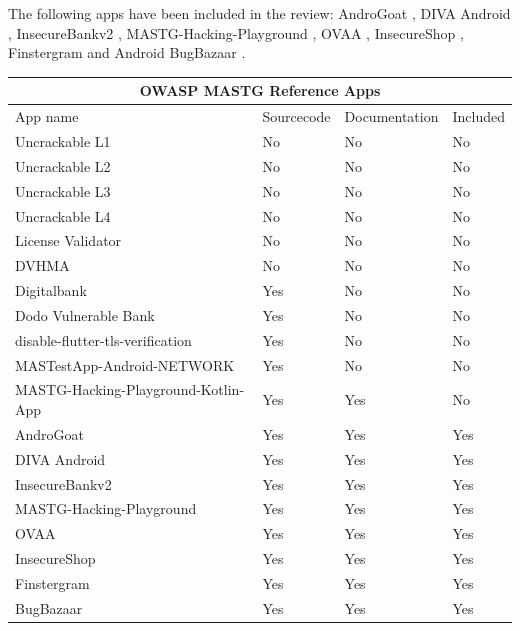 The following apps have been included in the review: AndroGoat \citep{andro_goat}, DIVA Android \citep{diva_android},  InsecureBankv2 \citep{insecure_bank_v2}, MASTG-Hacking-Playground \citep{mastg_hacking_playground}, OVAA \citep{ovaa}, InsecureShop \citep{insecure_shop}, Finstergram \citep{finstergram} and Android BugBazaar \citep{android_bugbazaar}.

\begin{tabular}{ |p{3cm}||p{3cm}|p{3cm}|p{3cm}|  }
    \hline
    \multicolumn{4}{|c|}{OWASP MASTG Reference Apps} \\
    \hline
    App name& Sourcecode & Documentation & Included \\
    \hline
    Uncrackable L1   &  No   & No &  No \\
    \hline
    Uncrackable L2   &  No   & No &  No \\
    \hline
    Uncrackable L3   &  No   & No &  No \\
    \hline
    Uncrackable L4   &  No   & No &  No \\
    \hline
    License Validator   &  No   & No &  No \\
    \hline
    DVHMA   &  No   & No &  No \\
    \hline
    Digitalbank   &  Yes   & No &  No \\
    \hline
    Dodo Vulnerable Bank   &  Yes   & No &  No \\
    \hline
    disable-flutter-tls-verification   &  Yes   & No &  No \\
    \hline
    MASTestApp-Android-NETWORK   &  Yes & No &  No \\
    \hline
    MASTG-Hacking-Playground-Kotlin-App  & Yes & Yes &  No \\
    \hline
    AndroGoat  & Yes & Yes &  Yes \\
    \hline
    DIVA Android  & Yes & Yes &  Yes \\
    \hline
    InsecureBankv2 & Yes & Yes &  Yes \\
    \hline
    MASTG-Hacking-Playground & Yes & Yes &  Yes \\
    \hline
    OVAA & Yes & Yes &  Yes \\
    \hline
    InsecureShop & Yes & Yes &  Yes \\
    \hline
    Finstergram & Yes & Yes &  Yes \\
    \hline
    BugBazaar & Yes & Yes &  Yes \\
    \hline
\end{tabular}

